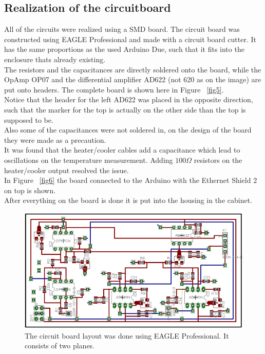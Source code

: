 \documentclass[12pt]{scrartcl}
\begin{document}
    \subsection{Realization of the circuitboard}
      All of the circuits were realized using a SMD board. The circuit board was
      constructed using EAGLE Professional and made with a circuit board cutter.
      It has the same proportions as the used Arduino Due, such that it fits
      into the enclosure thats already existing.
      \\The resistors and the capacitances are directly soldered onto the board,
      while the OpAmp OP07 and the differential amplifier AD622
      (not 620 as on the image) are put onto
      headers. The complete board is shown here in Figure~ \ref{fig5}.
      \\ Notice that the header for the left AD622 was placed in the opposite
      direction, such that the marker for the top is actually on the other side
      than the top is supposed to be.\\
      Also some of the capacitances were not soldered in, on the design of the
      board they were made as a precaution.\\
      It was found that the heater/cooler cables add a capacitance which lead
      to oscillations on the temperature measurement. Adding $100 \Omega$
      resistors on the heater/cooler output resolved the issue.\\ In Figure~
      \ref{fig6} the board connected to the Arduino with the Ethernet
      Shield 2 on top is shown. \\
      After everything on the board is done it is put into the housing in the
      cabinet.
      \begin{figure}[H]
        \includegraphics[width = \textwidth]{board.png}
        \caption{The circuit board layout was done using EAGLE Professional.
        It consists of two planes.}
        \label{fig4}
      \end{figure}
\end{document}
